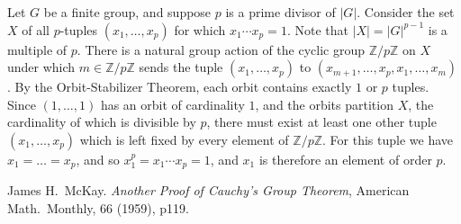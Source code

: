 \documentclass{article}
\begin{document}

Let $G$ be a finite group, and suppose $p$ is a prime divisor of $|G|$.
Consider the set $X$ of all $p$-tuples $(x_1, \ldots, x_p)$ 
for which $x_1\cdots x_p = 1$.
Note that $|X| = |G|^{p-1}$ is a multiple of $p$.
There is a natural group action of 
the cyclic group $\mathbb{Z}/p\mathbb{Z}$ on $X$
under which $m \in \mathbb{Z}/p\mathbb{Z}$ sends 
the tuple $(x_1, \ldots, x_p)$ 
to $(x_{m+1}, \ldots, x_p, x_1, \ldots, x_m)$.
By the Orbit-Stabilizer Theorem, each orbit contains exactly $1$ or $p$ tuples.
Since $(1,\ldots, 1)$ has an orbit of cardinality $1$, 
and the orbits partition $X$,
the cardinality of which is divisible by $p$,
there must exist at least one other tuple $(x_1,\ldots, x_p)$
which is left fixed by every element of $\mathbb{Z}/p\mathbb{Z}$.
For this tuple we have $x_1 = \ldots = x_p$,
and so $x_1^p=x_1\cdots x_p=1$,
and $x_1$ is therefore an element of order $p$.

\begin{thebibliography}{9}
 James H.~McKay.
 {\it Another Proof of Cauchy's Group Theorem},
 American Math.~Monthly, 66 (1959), p119.
\end{thebibliography}
\end{document}
